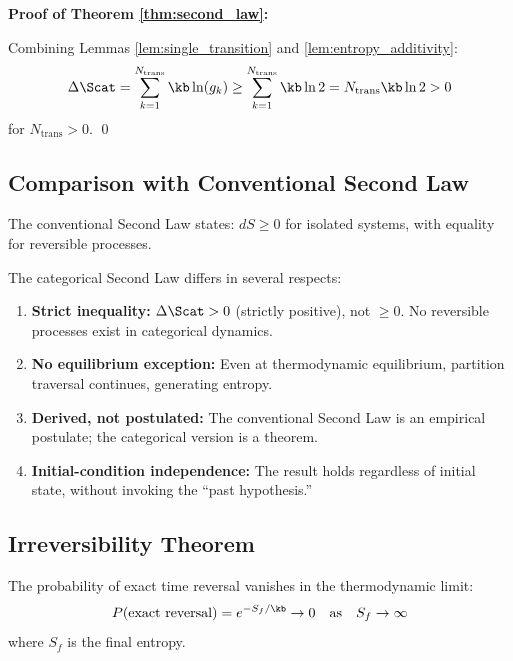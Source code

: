 \textbf{Proof of Theorem \ref{thm:second_law}:}

Combining Lemmas \ref{lem:single_transition} and \ref{lem:entropy_additivity}:
\begin{equation}
\Delta \Scat = \sum_{k=1}^{N_{\text{trans}}} \kb \ln(g_k) \geq \sum_{k=1}^{N_{\text{trans}}} \kb \ln 2 = N_{\text{trans}} \kb \ln 2 > 0
\end{equation}
for $N_{\text{trans}} > 0$. \qed

\subsection{Comparison with Conventional Second Law}

The conventional Second Law states: $dS \geq 0$ for isolated systems, with equality for reversible processes.

The categorical Second Law differs in several respects:

\begin{enumerate}
    \item \textbf{Strict inequality:} $\Delta \Scat > 0$ (strictly positive), not $\geq 0$. No reversible processes exist in categorical dynamics.

    \item \textbf{No equilibrium exception:} Even at thermodynamic equilibrium, partition traversal continues, generating entropy.

    \item \textbf{Derived, not postulated:} The conventional Second Law is an empirical postulate; the categorical version is a theorem.

    \item \textbf{Initial-condition independence:} The result holds regardless of initial state, without invoking the ``past hypothesis.''
\end{enumerate}

\subsection{Irreversibility Theorem}

\begin{theorem}
\label{thm:irreversibility}
The probability of exact time reversal vanishes in the thermodynamic limit:
\begin{equation}
P(\text{exact reversal}) = e^{-S_f/\kb} \to 0 \quad \text{as} \quad S_f \to \infty
\label{eq:irreversibility}
\end{equation}
where $S_f$ is the final entropy.
\end{theorem}

